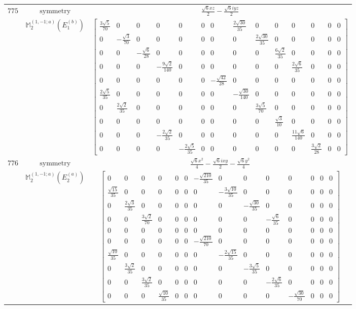 \documentclass[fleqn,8pt,landscape]{jsarticle}
\begin{document}
\begin{longtable}{ccc}
$ 775 $ & $ \text{symmetry} $ & $ \frac{\sqrt{6} x z}{2} - \frac{\sqrt{6} i y z}{2} $ \\
$  $ & $ \mathbb{M}_{2}^{(1,-1;a)}(E_{1}^{(b)}) $ & $ \begin{bmatrix} \frac{3 \sqrt{5}}{70} & 0 & 0 & 0 & 0 & 0 & 0 & \frac{2 \sqrt{30}}{35} & 0 & 0 & 0 & 0 & 0 & 0 \\ 0 & - \frac{\sqrt{3}}{70} & 0 & 0 & 0 & 0 & 0 & 0 & \frac{2 \sqrt{30}}{35} & 0 & 0 & 0 & 0 & 0 \\ 0 & 0 & - \frac{\sqrt{6}}{28} & 0 & 0 & 0 & 0 & 0 & 0 & \frac{6 \sqrt{2}}{35} & 0 & 0 & 0 & 0 \\ 0 & 0 & 0 & - \frac{9 \sqrt{2}}{140} & 0 & 0 & 0 & 0 & 0 & 0 & \frac{2 \sqrt{6}}{35} & 0 & 0 & 0 \\ 0 & 0 & 0 & 0 & 0 & 0 & - \frac{\sqrt{42}}{28} & 0 & 0 & 0 & 0 & 0 & 0 & 0 \\ \frac{2 \sqrt{5}}{35} & 0 & 0 & 0 & 0 & 0 & 0 & - \frac{\sqrt{30}}{140} & 0 & 0 & 0 & 0 & 0 & 0 \\ 0 & \frac{2 \sqrt{2}}{35} & 0 & 0 & 0 & 0 & 0 & 0 & \frac{3 \sqrt{5}}{70} & 0 & 0 & 0 & 0 & 0 \\ 0 & 0 & 0 & 0 & 0 & 0 & 0 & 0 & 0 & \frac{\sqrt{3}}{10} & 0 & 0 & 0 & 0 \\ 0 & 0 & 0 & - \frac{2 \sqrt{2}}{35} & 0 & 0 & 0 & 0 & 0 & 0 & \frac{11 \sqrt{6}}{140} & 0 & 0 & 0 \\ 0 & 0 & 0 & 0 & - \frac{2 \sqrt{5}}{35} & 0 & 0 & 0 & 0 & 0 & 0 & \frac{3 \sqrt{2}}{28} & 0 & 0 \end{bmatrix} $ \\ \hline
$ 776 $ & $ \text{symmetry} $ & $ \frac{\sqrt{6} x^{2}}{4} - \frac{\sqrt{6} i x y}{2} - \frac{\sqrt{6} y^{2}}{4} $ \\
$  $ & $ \mathbb{M}_{2}^{(1,-1;a)}(E_{2}^{(a)}) $ & $ \begin{bmatrix} 0 & 0 & 0 & 0 & 0 & 0 & - \frac{\sqrt{210}}{35} & 0 & 0 & 0 & 0 & 0 & 0 & 0 \\ \frac{\sqrt{15}}{35} & 0 & 0 & 0 & 0 & 0 & 0 & - \frac{3 \sqrt{10}}{35} & 0 & 0 & 0 & 0 & 0 & 0 \\ 0 & \frac{2 \sqrt{3}}{35} & 0 & 0 & 0 & 0 & 0 & 0 & - \frac{\sqrt{30}}{35} & 0 & 0 & 0 & 0 & 0 \\ 0 & 0 & \frac{3 \sqrt{2}}{70} & 0 & 0 & 0 & 0 & 0 & 0 & - \frac{\sqrt{6}}{35} & 0 & 0 & 0 & 0 \\ 0 & 0 & 0 & 0 & 0 & 0 & 0 & 0 & 0 & 0 & 0 & 0 & 0 & 0 \\ 0 & 0 & 0 & 0 & 0 & 0 & - \frac{\sqrt{210}}{70} & 0 & 0 & 0 & 0 & 0 & 0 & 0 \\ \frac{\sqrt{10}}{35} & 0 & 0 & 0 & 0 & 0 & 0 & - \frac{2 \sqrt{15}}{35} & 0 & 0 & 0 & 0 & 0 & 0 \\ 0 & \frac{3 \sqrt{2}}{35} & 0 & 0 & 0 & 0 & 0 & 0 & - \frac{3 \sqrt{5}}{35} & 0 & 0 & 0 & 0 & 0 \\ 0 & 0 & \frac{3 \sqrt{2}}{35} & 0 & 0 & 0 & 0 & 0 & 0 & - \frac{2 \sqrt{6}}{35} & 0 & 0 & 0 & 0 \\ 0 & 0 & 0 & \frac{\sqrt{10}}{35} & 0 & 0 & 0 & 0 & 0 & 0 & - \frac{\sqrt{30}}{70} & 0 & 0 & 0 \end{bmatrix} $ \\ \hline

\end{longtable}
\end{document}

